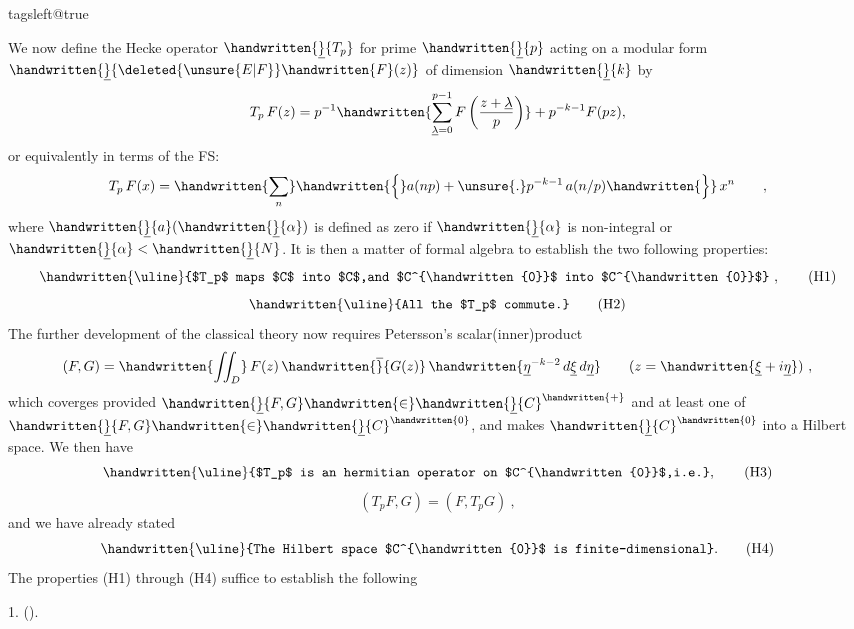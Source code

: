 \noindent\hfill{}\par
\begingroup
\csname tagsleft@true\endcsname

We now define the Hecke operator $\handwritten{\underline}{T_p}$ for prime $\handwritten{\underline}{p}$ acting on a modular form $\handwritten{\underline}{\deleted{\unsure{E|F}}\handwritten{F}(z)}$ of dimension $\handwritten{\underline}{k}$ by
\[
T_p\,F(z)=p^{-1}\handwritten{\sum_{\underline{\lambda}=0}^{p-1}F\left(\frac{z+\underline{\lambda}}{p}\right)}
+p^{-k-1}F(pz),
\]
or equivalently in terms of the FS:
\[
T_p\,F(x)=\handwritten{\sum_n}\handwritten{\Bigl\{}a(np)+\unsure{.}p^{-k-1}\,a(n/p)\handwritten{\Bigr\}}\,x^n\qquad ,
\]
where $\handwritten{\underline}{a}(\handwritten{\underline}{\alpha})$ is defined as zero if $\handwritten{\underline}{\alpha}$ is non-integral or $\handwritten{\underline}{\alpha}<\handwritten{\underline}{N}$. It is then a matter of formal algebra to establish the two following properties:
\[
\text{\handwritten{\uline}{$T_p$ maps $C$ into $C$,and $C^{\handwritten{0}}$ into $C^{\handwritten{0}}$}}\ ,
\tag*{(H1)}
\]
\[
\text{\handwritten{\uline}{All the $T_p$ commute.}}
\tag*{(H2)}
\]
The further development of the classical theory now requires Petersson's scalar(inner)product
\[
(F,G)=\handwritten{\iint_{D}}\,F(z)\,\handwritten{\overline}{G(z)}\,\handwritten{\underline{\eta}^{-k-2}\,d\underline{\xi}\,d\underline{\eta}}
\qquad (z=\handwritten{\underline{\xi}+i\underline{\eta}})\ ,
\]
which coverges provided $\handwritten{\underline}{F,G}\handwritten{\in}\handwritten{\underline}{C}^{\handwritten{+}}$ and at least one of $\handwritten{\underline}{F,G}\handwritten{\in}\handwritten{\underline}{C}^{\handwritten{0}}$, and makes $\handwritten{\underline}{C}^{\handwritten{0}}$ into a Hilbert space. We then have
\[
\text{\handwritten{\uline}{$T_p$ is an hermitian operator on $C^{\handwritten{0}}$,i.e.}}, 
\tag*{(H3)}
\]
\[
(T_pF,G)=(F,T_pG)\ ,
\]
and we have already stated
\[
\text{\handwritten{\uline}{The Hilbert space $C^{\handwritten{0}}$ is finite-dimensional}.}
\tag*{(H4)}
\]
The properties (H1) through (H4) suffice to establish the following

 1. ().

